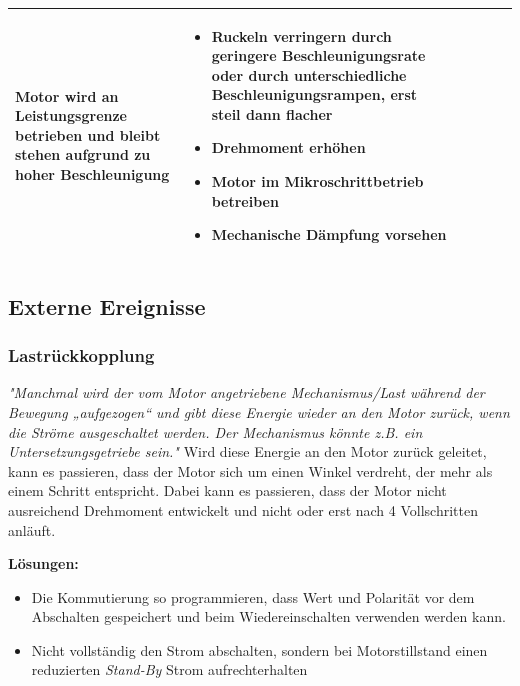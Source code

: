 {{{{\begin{center}
\begin{tabularx}{\textwidth}{|X|X|X|X|X|X|}
						Motor wird an Leistungsgrenze betrieben und bleibt stehen aufgrund zu hoher Beschleunigung & 
						\begin{itemize} 
							\item {Ruckeln verringern durch geringere Beschleunigungsrate oder durch unterschiedliche Beschleunigungsrampen, erst steil dann flacher} 
							\item {Drehmoment erhöhen} 
							\item {Motor im Mikroschrittbetrieb betreiben} 
							\item {Mechanische Dämpfung vorsehen} 
						\end{itemize}	 \\	\hline
					\end{tabularx}
				\end{center}
				
				
				
				\subsection{Externe Ereignisse}
				\subsubsection{Lastrückkopplung}
				\textit{"Manchmal wird der vom Motor angetriebene Mechanismus/Last während der Bewegung „aufgezogen“ und gibt diese Energie wieder an den Motor zurück, wenn die Ströme ausgeschaltet werden. Der Mechanismus könnte z.B. ein Untersetzungsgetriebe sein."}\cite{FaulhaberDriveSystems.2020} 
				Wird diese Energie an den Motor zurück geleitet, kann es passieren, dass der Motor sich um einen Winkel verdreht, der mehr als einem Schritt entspricht. Dabei kann es passieren, dass der Motor nicht ausreichend Drehmoment entwickelt und nicht oder erst nach 4 Vollschritten anläuft. \cite{FaulhaberDriveSystems.2020}
				
				\textbf{Lösungen:}
				\begin{itemize}
					\item Die Kommutierung so programmieren, dass Wert und Polarität vor dem Abschalten gespeichert und beim Wiedereinschalten verwenden werden kann. 
					\item Nicht vollständig den Strom abschalten, sondern bei Motorstillstand einen reduzierten \textit{Stand-By} Strom aufrechterhalten
				\end{itemize}
				
}}}}
